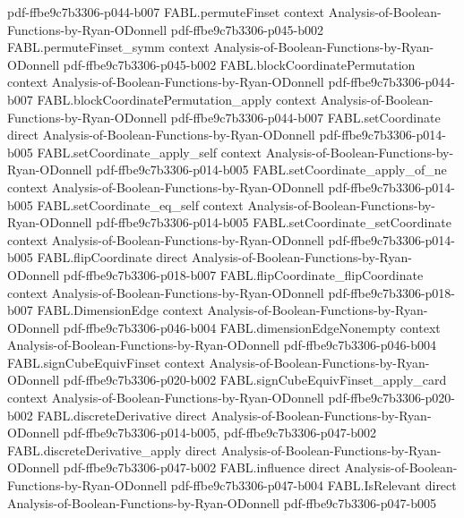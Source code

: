 \begin{theorem}
  {pdf-ffbe9c7b3306-p044-b007}
\proofstep
  {FABL.permuteFinset}
  {context}
  {Analysis-of-Boolean-Functions-by-Ryan-ODonnell}
  {pdf-ffbe9c7b3306-p045-b002}
\proofstep
  {FABL.permuteFinset_symm}
  {context}
  {Analysis-of-Boolean-Functions-by-Ryan-ODonnell}
  {pdf-ffbe9c7b3306-p045-b002}
\proofstep
  {FABL.blockCoordinatePermutation}
  {context}
  {Analysis-of-Boolean-Functions-by-Ryan-ODonnell}
  {pdf-ffbe9c7b3306-p044-b007}
\proofstep
  {FABL.blockCoordinatePermutation_apply}
  {context}
  {Analysis-of-Boolean-Functions-by-Ryan-ODonnell}
  {pdf-ffbe9c7b3306-p044-b007}
\proofstep
  {FABL.setCoordinate}
  {direct}
  {Analysis-of-Boolean-Functions-by-Ryan-ODonnell}
  {pdf-ffbe9c7b3306-p014-b005}
\proofstep
  {FABL.setCoordinate_apply_self}
  {context}
  {Analysis-of-Boolean-Functions-by-Ryan-ODonnell}
  {pdf-ffbe9c7b3306-p014-b005}
\proofstep
  {FABL.setCoordinate_apply_of_ne}
  {context}
  {Analysis-of-Boolean-Functions-by-Ryan-ODonnell}
  {pdf-ffbe9c7b3306-p014-b005}
\proofstep
  {FABL.setCoordinate_eq_self}
  {context}
  {Analysis-of-Boolean-Functions-by-Ryan-ODonnell}
  {pdf-ffbe9c7b3306-p014-b005}
\proofstep
  {FABL.setCoordinate_setCoordinate}
  {context}
  {Analysis-of-Boolean-Functions-by-Ryan-ODonnell}
  {pdf-ffbe9c7b3306-p014-b005}
\proofstep
  {FABL.flipCoordinate}
  {direct}
  {Analysis-of-Boolean-Functions-by-Ryan-ODonnell}
  {pdf-ffbe9c7b3306-p018-b007}
\proofstep
  {FABL.flipCoordinate_flipCoordinate}
  {context}
  {Analysis-of-Boolean-Functions-by-Ryan-ODonnell}
  {pdf-ffbe9c7b3306-p018-b007}
\proofstep
  {FABL.DimensionEdge}
  {context}
  {Analysis-of-Boolean-Functions-by-Ryan-ODonnell}
  {pdf-ffbe9c7b3306-p046-b004}
\proofstep
  {FABL.dimensionEdgeNonempty}
  {context}
  {Analysis-of-Boolean-Functions-by-Ryan-ODonnell}
  {pdf-ffbe9c7b3306-p046-b004}
\proofstep
  {FABL.signCubeEquivFinset}
  {context}
  {Analysis-of-Boolean-Functions-by-Ryan-ODonnell}
  {pdf-ffbe9c7b3306-p020-b002}
\proofstep
  {FABL.signCubeEquivFinset_apply_card}
  {context}
  {Analysis-of-Boolean-Functions-by-Ryan-ODonnell}
  {pdf-ffbe9c7b3306-p020-b002}
\proofstep
  {FABL.discreteDerivative}
  {direct}
  {Analysis-of-Boolean-Functions-by-Ryan-ODonnell}
  {pdf-ffbe9c7b3306-p014-b005,
    pdf-ffbe9c7b3306-p047-b002}
\proofstep
  {FABL.discreteDerivative_apply}
  {direct}
  {Analysis-of-Boolean-Functions-by-Ryan-ODonnell}
  {pdf-ffbe9c7b3306-p047-b002}
\proofstep
  {FABL.influence}
  {direct}
  {Analysis-of-Boolean-Functions-by-Ryan-ODonnell}
  {pdf-ffbe9c7b3306-p047-b004}
\proofstep
  {FABL.IsRelevant}
  {direct}
  {Analysis-of-Boolean-Functions-by-Ryan-ODonnell}
  {pdf-ffbe9c7b3306-p047-b005}

\end{theorem}
